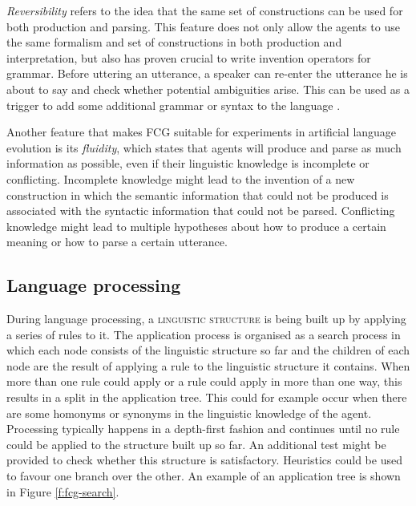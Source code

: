 \emph{Reversibility} refers to the idea that the same set of
constructions can be used for both production and parsing. This
feature does not only allow the agents to use the same formalism and
set of constructions in both production and interpretation, but also
has proven crucial to write invention operators for grammar. Before
uttering an utterance, a speaker can re-enter the utterance he is
about to say and check whether potential ambiguities arise. This can
be used as a trigger to add some additional grammar or syntax to the
language \citep{steels06how}.

Another feature that makes FCG suitable for experiments in artificial
language evolution is its \emph{fluidity}, which states that agents
will produce and parse as much information as possible, even if their
linguistic knowledge is incomplete or conflicting. Incomplete
knowledge might lead to the invention of a new construction in which
the semantic information that could not be produced is associated with
the syntactic information that could not be parsed. Conflicting
knowledge might lead to multiple hypotheses about how to produce a
certain meaning or how to parse a certain utterance.

\subsection{Language processing}

During language processing, a \textsc{linguistic
  structure} is being built up by applying
a series of rules to it. The application process is organised as a
search process in which each node consists of the linguistic structure
so far and the children of each node are the result of applying a rule
to the linguistic structure it contains. When more than one rule could
apply or a rule could apply in more than one way, this results in a
split in the application tree. This could for example occur when there
are some homonyms or synonyms in the linguistic knowledge of the
agent. Processing typically happens in a depth-first fashion and
continues until no rule could be applied to the structure built up so
far. An additional test might be provided to check whether this
structure is satisfactory. Heuristics could be used to favour one
branch over the other. An example of an application tree is shown in
Figure \ref{f:fcg-search}.

